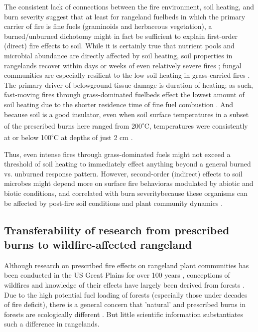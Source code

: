 \documentclass[fire,article,submit,oneauthor,pdftex]{Definitions/mdpi}
\begin{document}
The consistent lack of connections between the fire environment, soil heating, and burn severity suggest that at least for rangeland fuelbeds in which the primary carrier of fire is fine fuels (graminoids and herbaceous vegetation), a burned/unburned dichotomy might in fact be sufficient to explain first-order (direct) fire effects to soil. 
While it is certainly true that nutrient pools and microbial abundance are directly affected by soil heating, soil properties in rangelands recover within days or weeks of even relatively severe fires \cite{mcgranahan2022,docherty2012}; fungal communities are especially resilient to the low soil heating in grass-carried fires \cite{egidi2016}. 
The primary driver of belowground tissue damage is duration of heating; as such, fast-moving fires through grass-dominated fuelbeds effect the lowest amount of soil heating due to the shorter residence time of fine fuel combustion \cite{neary1999a, robichaud2000}. 
And because soil is a good insulator, even when soil surface temperatures in a subset of the prescribed burns here ranged from 200\textsuperscript{$\circ$}C, temperatures were consistently at or below 100\textsuperscript{$\circ$}C at depths of just 2 cm \cite{mcgranahan2022}. 

Thus, even intense fires through grass-dominated fuels might not exceed a threshold of soil heating to immediately effect anything beyond a general burned vs. unburned response pattern. 
However, second-order (indirect) effects to soil microbes might depend more on surface fire behavior\textemdash as modulated by abiotic and biotic conditions, and correlated with burn severity\textemdash because these organisms can be affected by post-fire soil conditions and plant community dynamics \cite{neary1999a}.

\subsection{Transferability of research from prescribed burns to wildfire-affected rangeland}

Although research on prescribed fire effects on rangeland plant communities has been conducted in the US Great Plains for over 100 years \cite{hensel1923, aldous1934, hulbert1969}, conceptions of wildfires and knowledge of their effects have largely been derived from forests \cite{crist2023}.
Due to the high potential fuel loading of forests (especially those under decades of fire deficit), there is a general concern that 'natural' and prescribed burns in forests are ecologically different \cite{williams1994}.  
But little scientific information substantiates such a difference in rangelands. 
\end{document}
